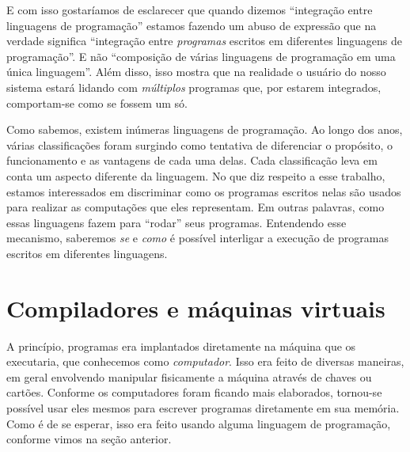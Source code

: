 
  E com isso gostaríamos de esclarecer que quando dizemos ``integração entre
  linguagens de programação'' estamos fazendo um abuso de expressão que na
  verdade significa ``integração entre \emph{programas} escritos em diferentes
  linguagens de programação''. E não ``composição de várias linguagens de
  programação em uma única linguagem''. Além disso, isso mostra que na realidade
  o usuário do nosso sistema estará lidando com \emph{múltiplos} programas que,
  por estarem integrados, comportam-se como se fossem um só.

  Como sabemos, existem inúmeras linguagens de programação. Ao longo dos anos,
  várias classificações foram surgindo como tentativa de diferenciar o
  propósito, o funcionamento e as vantagens de cada uma delas. Cada
  classificação leva em conta um aspecto diferente da linguagem. No que diz
  respeito a esse trabalho, estamos interessados em discriminar como os
  programas escritos nelas são usados para realizar as computações que eles
  representam. Em outras palavras, como essas linguagens fazem para ``rodar''
  seus programas. Entendendo esse mecanismo, saberemos \emph{se} e \emph{como} é
  possível interligar a execução de programas escritos em diferentes linguagens.

  \section{Compiladores e máquinas virtuais}
  \label{cap:conceitos:compiladores}


    A princípio, programas era implantados diretamente na máquina que os
    executaria, que conhecemos como \emph{computador}. Isso era feito de diversas
    maneiras, em geral envolvendo manipular fisicamente a máquina através de
    chaves ou cartões. Conforme os computadores foram ficando mais elaborados,
    tornou-se possível usar eles mesmos para escrever programas diretamente em
    sua memória. Como é de se esperar, isso era feito usando alguma linguagem
    de programação, conforme vimos na seção anterior.

